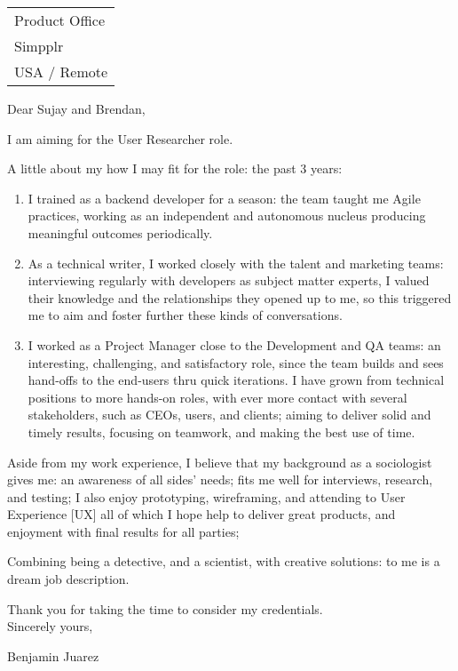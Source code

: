 \hfill%
\bigskip %

\begin{tabular}{@{} l}
    Product Office \\ %
    Simpplr     \\ 
    USA / Remote 
\end{tabular}

\bigskip 

Dear Sujay and Brendan,

I am aiming for the User Researcher role.

A little about my 
how I may fit for the role:
the 
past 3 years:

\begin{enumerate}
\item 
I trained as a backend developer for a season: 
the team taught me Agile practices, working as an independent
and autonomous nucleus producing meaningful outcomes periodically.
\item 
As a technical writer, I worked closely with the talent and
marketing teams: interviewing regularly with developers as subject
matter experts, I valued their knowledge and the relationships they
opened up to me, so this triggered me to aim and foster further these
kinds of conversations.
\item 
I worked as a Project Manager close to the
Development and QA teams: 
an interesting, challenging, and satisfactory role, 
since the team builds and sees hand-offs to the end-users thru quick iterations. 
I have grown from technical positions to more hands-on
roles, with ever more contact with several stakeholders, such as CEOs,
users, and clients; aiming to deliver solid and timely results, focusing
on teamwork, and making the best use of time.
\end{enumerate}

Aside from my work experience, 
I believe that my background as a sociologist gives me:
% 
  an awareness of all sides' needs;
  fits me well for interviews, research, and testing;
  I also enjoy prototyping, wireframing, and attending to User
  Experience {[}UX{]} all of which I hope help to deliver great
  products, and enjoyment with final results for all parties;

Combining being a detective, and a scientist, with creative solutions:
  to me is a dream job description.

\vspace{-\topsep}

Thank you for taking the time to consider my credentials.\\
Sincerely yours,

Benjamin Juarez
